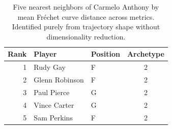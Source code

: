 \begin{table}[htbp]
  \centering\small
  \begin{tabular}{rllc}
    \toprule
    Rank & Player & Position & Archetype \\
    \midrule
    1 & Rudy Gay & F & 2 \\
    2 & Glenn Robinson & F & 2 \\
    3 & Paul Pierce & G & 2 \\
    4 & Vince Carter & G & 2 \\
    5 & Sam Perkins & F & 2 \\
    \bottomrule
  \end{tabular}
  \caption{Five nearest neighbors of Carmelo Anthony by mean Fr\'{e}chet curve distance across metrics. Identified purely from trajectory shape without dimensionality reduction.}
  \label{tab:Carmelo_Anthony_frechet_curve_neighbors}
\end{table}

